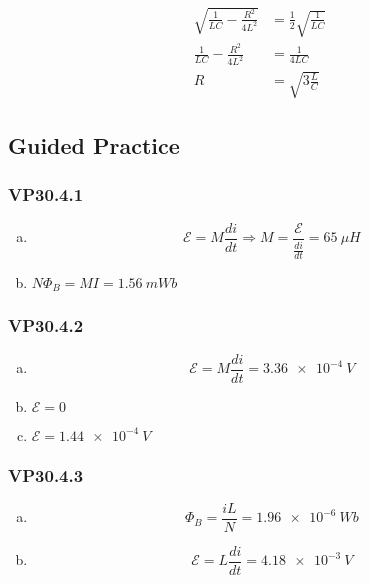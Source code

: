 \documentclass{article}
\begin{document}
\begin{align*}
  \sqrt{\frac{1}{L C} - \frac{R^2}{4 L^2}} & = \frac{1}{2} \sqrt{\frac{1}{L C}} \\
  \frac{1}{L C} - \frac{R^2}{4 L^2}        & = \frac{1}{4 L C}                  \\
  R                                        & = \sqrt{3 \frac{L}{C}}
\end{align*}

\subsection{Guided Practice}

\subsubsection{VP30.4.1}

\begin{enumerate}[(a)]
  \item \[\mathcal{E} = M \frac{di}{dt} \Rightarrow M = \frac{\mathcal{E}}{\frac{di}{dt}} = \qty{65}{\mu H}\]

  \item $N \Phi_B = M I = \qty{1.56}{mWb}$
\end{enumerate}

\subsubsection{VP30.4.2}

\begin{enumerate}[(a)]
  \item \[\mathcal{E} = M \frac{di}{dt} = \qty{3.36e-4}{V}\]

  \item $\mathcal{E} = 0$

  \item $\mathcal{E} = \qty{1.44e-4}{V}$
\end{enumerate}

\subsubsection{VP30.4.3}

\begin{enumerate}[(a)]
  \item \[\Phi_B = \frac{i L}{N} = \qty{1.96e-6}{Wb}\]

  \item \[\mathcal{E} = L \frac{di}{dt} = \qty{4.18e-3}{V}\]
\end{enumerate}
\end{document}
